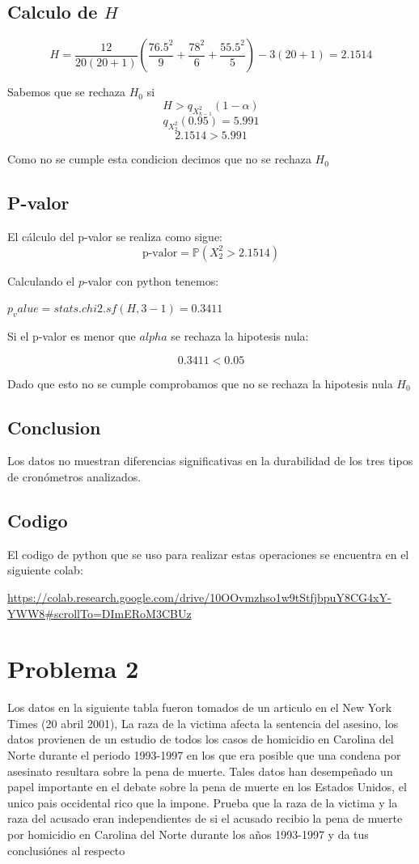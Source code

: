 \documentclass{article}
\begin{document}
\subsection*{Calculo de $H$}

\[ H = \frac{12}{20(20 + 1)} \left(\frac{76.5^2}{9} + \frac{78^2}{6} + \frac{55.5^2}{5}\right) - 3(20 + 1) = 2.1514 \]

Sabemos que se rechaza $H_0$ si
\[H > q_{X^{2}_{k-1}}(1 - \alpha)\]
\[q_{X^{2}_{2}}(0.95) = 5.991\]
\[2.1514 > 5.991\]

Como no se cumple esta condicion decimos que no se rechaza $H_0$

\subsection*{P-valor}

El cálculo del p-valor se realiza como sigue:
\[\text{p-valor} = \mathbb{P}(X^2_2 > 2.1514)\]

Calculando el $p$-valor con python tenemos:

$p_ value = stats.chi2.sf(H, 3 - 1) = 0.3411$

Si el p-valor es menor que $alpha$ se rechaza la hipotesis nula:

\[0.3411 < 0.05\]

Dado que esto no se cumple comprobamos que no se rechaza la hipotesis nula $H_0$

\subsection*{Conclusion}
Los datos no muestran diferencias significativas en la durabilidad de los tres tipos de cronómetros analizados.

\subsection*{Codigo}

El codigo de python que se uso para realizar estas operaciones se encuentra en el siguiente colab:

\url{https://colab.research.google.com/drive/10OOvmzhso1w9tStfjbpuY8CG4xY-YWW8#scrollTo=DImERoM3CBUz}

\newpage

\section{Problema 2}

Los datos en la siguiente tabla fueron tomados de un articulo en el New York Times (20 abril 2001), La raza de la victima afecta la sentencia del asesino, los datos provienen de un estudio  de todos los casos de homicidio en Carolina del Norte durante el periodo 1993-1997 en los  que era posible que una condena por asesinato resultara sobre la pena de muerte. Tales datos han desempeñado un papel importante en el debate sobre la pena de muerte en los Estados Unidos, el unico pais occidental rico que la impone. Prueba que la raza de la victima y la raza del acusado eran independientes de si el acusado recibio la pena de muerte por homicidio en Carolina del Norte durante los años 1993-1997 y da tus conclusiónes al respecto
\end{document}
